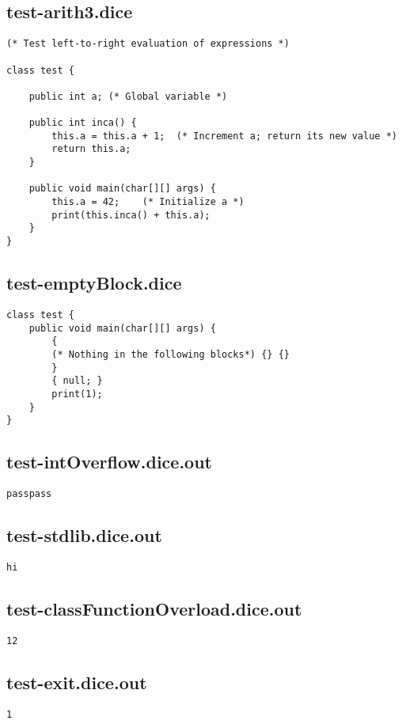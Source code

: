 \subsection{test-arith3.dice}
\begin{verbatim}
(* Test left-to-right evaluation of expressions *)

class test {

	public int a; (* Global variable *)

	public int inca() { 
		this.a = this.a + 1;  (* Increment a; return its new value *)
		return this.a; 
	} 

	public void main(char[][] args) {
  		this.a = 42;    (* Initialize a *)
  		print(this.inca() + this.a);
	}
}

\end{verbatim}
\pagebreak
\subsection{test-emptyBlock.dice}
\begin{verbatim}
class test {
	public void main(char[][] args) {
		{
		(* Nothing in the following blocks*) {} {}
		}
		{ null; }
		print(1);
	}
}

\end{verbatim}
\pagebreak
\subsection{test-intOverflow.dice.out}
\begin{verbatim}
passpass
\end{verbatim}
\pagebreak
\subsection{test-stdlib.dice.out}
\begin{verbatim}
hi
\end{verbatim}
\pagebreak
\subsection{test-classFunctionOverload.dice.out}
\begin{verbatim}
12
\end{verbatim}
\pagebreak
\subsection{test-exit.dice.out}
\begin{verbatim}
1
\end{verbatim}
\pagebreak
